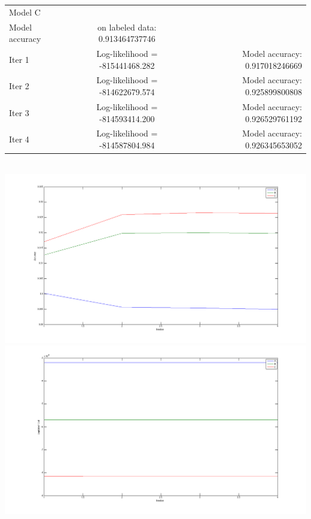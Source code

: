 \documentclass{article}
\begin{document}
\begin{enumerate}
\begin{enumerate}
\begin{tabular}{ l c r }
Model C & &\\
Model accuracy & on labeled data: 0.913464737746&\\
Iter 1 & Log-likelihood = -815441468.282 & Model accuracy: 0.917018246669\\
Iter 2 & Log-likelihood = -814622679.574 & Model accuracy: 0.925899800808\\
Iter 3 & Log-likelihood = -814593414.200 & Model accuracy: 0.926529761192\\
Iter 4 & Log-likelihood = -814587804.984 & Model accuracy: 0.926345653052\\
\end{tabular}\\
\newpage
\includegraphics[width=\textwidth]{../images/Task2}\\
\includegraphics[width=\textwidth]{../images/Task2Log} \\

\newpage


\end{enumerate}
\end{enumerate}
\end{document}
